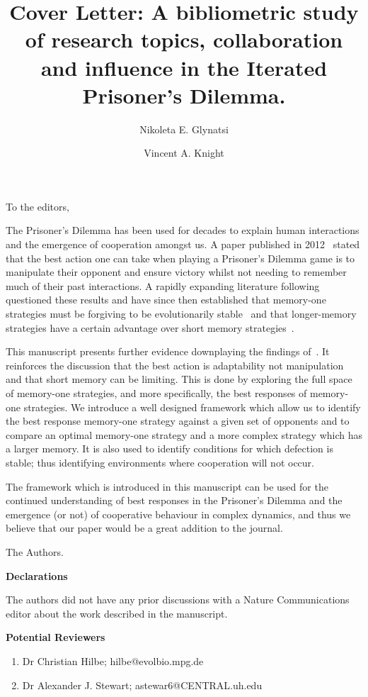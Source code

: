\documentclass{article}
\title{Cover Letter: A bibliometric study of research topics, collaboration and
influence in the Iterated Prisoner’s Dilemma.}
\author[1, *]{Nikoleta E. Glynatsi}
\author[1]{Vincent A. Knight}
\affil[1]{Cardiff University, School of Mathematics, Cardiff, United Kingdom}
\affil[*]{Corresponding author: Nikoleta E. Glynatsi, glynatsine@cardiff.ac.uk}
\date{}
\begin{document}
 
\maketitle

To the editors,
 
The Prisoner's Dilemma has been used for decades to explain human interactions
and the emergence of cooperation amongst us. A paper published in
2012~\cite{Press2012} stated that the best action one can take when playing a
Prisoner's Dilemma game is to manipulate their opponent and ensure victory
whilst not needing to remember much of their past interactions. A rapidly
expanding literature following~\cite{Press2012} questioned these results and
have since then established that memory-one strategies must be forgiving to be
evolutionarily stable~\cite{Stewart2013} and that longer-memory strategies have
a certain advantage over short memory strategies~\cite{Hilbe2017}.

This manuscript presents further evidence downplaying the findings
of~\cite{Press2012}. It reinforces the discussion that the best action is
adaptability not manipulation and that short memory can be limiting. This is
done by exploring the full space of memory-one strategies, and more specifically, the best
responses of memory-one strategies. We introduce a well designed framework which
allow us to identify the best response memory-one strategy against a given set
of opponents and to compare an optimal memory-one strategy and a more complex
strategy which has a larger memory. It is also used to identify conditions for
which defection is stable; thus identifying environments where cooperation will
not occur.
 
The framework which is introduced in this manuscript can be used for the
continued understanding of best responses in the Prisoner’s Dilemma and the
emergence (or not) of cooperative behaviour in complex dynamics, and thus we
believe that our paper would be a great addition to the journal.
 
The Authors.

\textbf{Declarations}

The authors did not have any prior discussions with a Nature Communications editor
about the work described in the manuscript.

\textbf{Potential Reviewers}

\begin{enumerate}
    \item Dr Christian Hilbe; hilbe@evolbio.mpg.de
    \item Dr Alexander J. Stewart; astewar6@CENTRAL.uh.edu
\end{enumerate}

 


\end{document}

